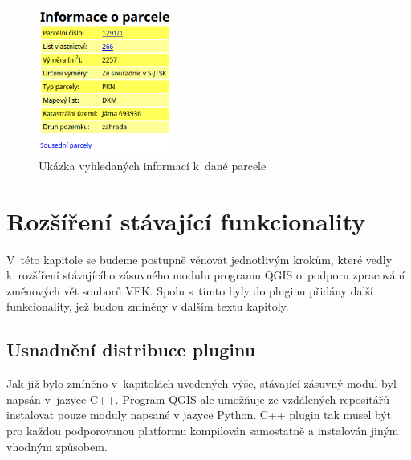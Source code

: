 \documentclass[a4paper,12pt,oneside]{book}
\begin{document}
\begin{figure}[htb]
\centering
\includegraphics[width=0.4\textwidth]{images/vfkPlugin-informace_o_parcele.png}
\caption[Ukázka vyhledaných informací k~dané parcele]{Ukázka vyhledaných informací k~dané parcele}
\label{l_informace_o_parcele}
\end{figure}



\clearpage
\chapter{Rozšíření stávající funkcionality}
\label{l_rozsireni_funkcionality}

V~této kapitole se budeme postupně věnovat jednotlivým krokům,
které vedly k~rozšíření stávajícího zásuvného modulu programu QGIS
o~podporu zpracování změnových vět souborů VFK. Spolu s~tímto byly do
pluginu přidány další funkcionality, jež budou zmíněny v dalším textu kapitoly.

\section{Usnadnění distribuce pluginu}

Jak již bylo zmíněno v~kapitolách uvedených výše, stávající zásuvný modul 
byl napsán v~jazyce C++. Program QGIS ale umožňuje ze vzdálených repositářů
instalovat pouze moduly napsané v jazyce Python. C++ plugin tak musel být
pro každou podporovanou platformu kompilován samostatně a instalován jiným 
vhodným způsobem.
\end{document}
